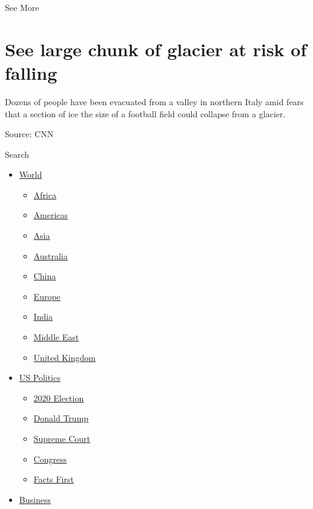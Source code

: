 See More

\hypertarget{see-large-chunk-of-glacier-at-risk-of-falling-2}{%
\section{See large chunk of glacier at risk of
falling}\label{see-large-chunk-of-glacier-at-risk-of-falling-2}}

Dozens of people have been evacuated from a valley in northern Italy
amid fears that a section of ice the size of a football field could
collapse from a glacier.

Source: CNN

Search

\begin{itemize}
\tightlist
\item
  \href{/world}{World}

  \begin{itemize}
  \tightlist
  \item
    \href{/africa}{Africa}
  \item
    \href{/americas}{Americas}
  \item
    \href{/asia}{Asia}
  \item
    \href{/australia}{Australia}
  \item
    \href{/china}{China}
  \item
    \href{/europe}{Europe}
  \item
    \href{/india}{India}
  \item
    \href{/middle-east}{Middle East}
  \item
    \href{/uk}{United Kingdom}
  \end{itemize}
\item
  \href{/politics}{US Politics}

  \begin{itemize}
  \tightlist
  \item
    \href{/election/2020}{2020 Election}
  \item
    \href{/specials/politics/president-donald-trump-45}{Donald Trump}
  \item
    \href{/specials/politics/supreme-court-nine}{Supreme Court}
  \item
    \href{/specials/politics/congress}{Congress}
  \item
    \href{/specials/politics/fact-check-politics}{Facts First}
  \end{itemize}
\item
  \href{/business}{Business}


\end{itemize}
